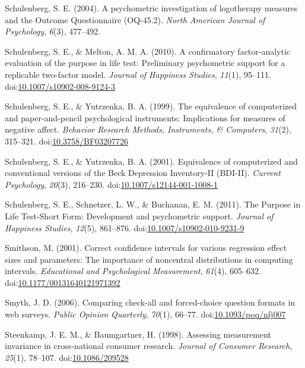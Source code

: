 \documentclass[english,man]{apa6}
\theoremstyle{definition}
\theoremstyle{definition}
\theoremstyle{definition}
\theoremstyle{remark}
\begin{document}
\hypertarget{ref-Schulenberg2004}{}
Schulenberg, S. E. (2004). A psychometric investigation of logotherapy
measures and the Outcome Questionnaire (OQ-45.2). \emph{North American
Journal of Psychology}, \emph{6}(3), 477--492.

\hypertarget{ref-Schulenberg2010}{}
Schulenberg, S. E., \& Melton, A. M. A. (2010). A confirmatory
factor-analytic evaluation of the purpose in life test: Preliminary
psychometric support for a replicable two-factor model. \emph{Journal of
Happiness Studies}, \emph{11}(1), 95--111.
doi:\href{https://doi.org/10.1007/s10902-008-9124-3}{10.1007/s10902-008-9124-3}

\hypertarget{ref-Schulenberg1999}{}
Schulenberg, S. E., \& Yutrzenka, B. A. (1999). The equivalence of
computerized and paper-and-pencil psychological instruments:
Implications for measures of negative affect. \emph{Behavior Research
Methods, Instruments, \& Computers}, \emph{31}(2), 315--321.
doi:\href{https://doi.org/10.3758/BF03207726}{10.3758/BF03207726}

\hypertarget{ref-Schulenberg2001}{}
Schulenberg, S. E., \& Yutrzenka, B. A. (2001). Equivalence of
computerized and conventional versions of the Beck Depression
Inventory-II (BDI-II). \emph{Current Psychology}, \emph{20}(3),
216--230.
doi:\href{https://doi.org/10.1007/s12144-001-1008-1}{10.1007/s12144-001-1008-1}

\hypertarget{ref-Schulenberg2011}{}
Schulenberg, S. E., Schnetzer, L. W., \& Buchanan, E. M. (2011). The
Purpose in Life Test-Short Form: Development and psychometric support.
\emph{Journal of Happiness Studies}, \emph{12}(5), 861--876.
doi:\href{https://doi.org/10.1007/s10902-010-9231-9}{10.1007/s10902-010-9231-9}

\hypertarget{ref-Smithson2001}{}
Smithson, M. (2001). Correct confidence intervals for various regression
effect sizes and parameters: The importance of noncentral distributions
in computing intervals. \emph{Educational and Psychological
Measurement}, \emph{61}(4), 605--632.
doi:\href{https://doi.org/10.1177/00131640121971392}{10.1177/00131640121971392}

\hypertarget{ref-Smyth2006}{}
Smyth, J. D. (2006). Comparing check-all and forced-choice question
formats in web surveys. \emph{Public Opinion Quarterly}, \emph{70}(1),
66--77.
doi:\href{https://doi.org/10.1093/poq/nfj007}{10.1093/poq/nfj007}

\hypertarget{ref-Steenkamp1998}{}
Steenkamp, J. E. M., \& Baumgartner, H. (1998). Assessing measurement
invariance in cross‐national consumer research. \emph{Journal of
Consumer Research}, \emph{25}(1), 78--107.
doi:\href{https://doi.org/10.1086/209528}{10.1086/209528}
\end{document}
